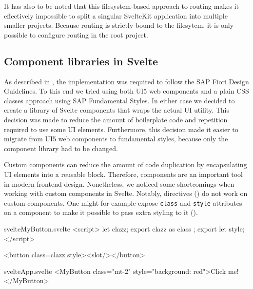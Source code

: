 It has also to be noted that this filesystem-based approach to routing makes it effectively impossible to split a singular SvelteKit application into multiple smaller projects. Because routing is strictly bound to the filesytem, it is only possible to configure routing in the root project.



\subsection{Component libraries in Svelte}
\label{sec:evaluation-ui-libs}
As described in , the implementation was required to follow the SAP Fiori Design Guidelines. To this end we tried using both UI5 web components and a plain CSS classes approach using SAP Fundamental Styles. In either case we decided to create a library of Svelte components that wraps the actual UI utility. This decision was made to reduce the amount of boilerplate code and repetition required to use some UI elements. Furthermore, this decision made it easier to migrate from UI5 web components to fundamental styles, because only the component library had to be changed. 

Custom components can reduce the amount of code duplication by encapsulating UI elements into a reusable block. Therefore, components are an important tool in modern frontend design. Nonetheless, we noticed some shortcomings when working with custom components in Svelte. Notably, directives () do not work on custom components. One might for example expose \texttt{class} and \texttt{style}-attributes on a component to make it possible to pass extra styling to it ().

\begin{listing}[H]
\begin{myminted}{svelte}{MyButton.svelte}
<script>
  let clazz;
  export { clazz as class };
  export let style;
</script>

<button class={clazz} {style}><slot/></button>
\end{myminted}
\begin{myminted}{svelte}{App.svelte}
<MyButton class="mt-2" style="background: red">Click me!</MyButton>
\end{myminted}
\caption{Svelte Component that provides a class and style attribute.}
\label{fig:evaluation-svelte-component-style}
\end{listing}

